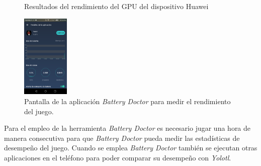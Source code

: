 \begin{figure}
   
  \caption{Resultados del rendimiento del GPU del dispositivo Huawei}
  \label{fig:GPUHuawei}
\end{figure}
                \begin{figure}[h]
                        \centering
                        \includegraphics[width=0.2\textwidth]{04ResultadosObetnidos/imagenes/baterry02.png}
                        \caption{Pantalla de la aplicación \textit{Battery Doctor} para medir el
                        rendimiento del juego.}
                        \label{fig:BateriaYolotl}
                \end{figure}
Para el empleo de la herramienta \textit{Battery Doctor} es necesario jugar una
hora de manera consecutiva para que \textit{Battery Doctor} pueda medir las
estadísticas de desempeño del juego. Cuando se emplea \textit{Battery Doctor}
también se ejecutan otras aplicaciones en el teléfono para poder comparar su
desempeño con \textit{Yolotl}.

